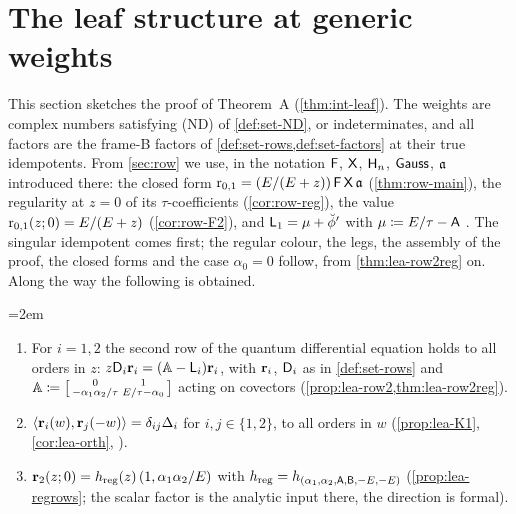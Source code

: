 \section{The leaf structure at generic weights}
\label{sec:lea}

This section sketches the proof of Theorem~A (\cref{thm:int-leaf}). The weights are complex numbers satisfying (ND) of \cref{def:set-ND}, or indeterminates, and all factors are the frame-B factors of \cref{def:set-rows,def:set-factors} at their true idempotents. From \cref{sec:row} we use, in the notation $\mathsf{F}$, $\mathsf{X}$, $\mathsf{H}_n$, $\mathsf{Gauss}$, $\mathfrak{a}$ introduced there: the closed form $\mathrm{r}_{0,1}=(E/(E+z))\,\mathsf{F}\,\mathsf{X}\,\mathfrak{a}$ (\cref{thm:row-main}), the regularity at $z=0$ of its $\tau$-coefficients (\cref{cor:row-reg}), the value $\mathrm{r}_{0,1}(z;0)=E/(E+z)$ (\cref{cor:row-F2}), and $\mathsf{L}_1=\mu+\breve{\phi}'$ with $\mu\coloneqq E/\tau-\mathsf{A}$ . The singular idempotent comes first; the regular colour, the legs, the assembly of the proof, the closed forms and the case $\alpha_0=0$ follow, from \cref{thm:lea-row2reg} on. Along the way the following is obtained.

\begin{thm}
\label{thm:lea-qde}
\emergencystretch=2em
\begin{enumerate}
\item For $i=1,2$ the second row of the quantum differential equation holds to all orders in $z$: $z\mathsf{D}_i\mathbf{r}_i=(\mathbb{A}-\mathsf{L}_i)\mathbf{r}_i$, with $\mathbf{r}_i$, $\mathsf{D}_i$ as in \cref{def:set-rows} and $\mathbb{A}\coloneqq\begin{bsmallmatrix}0&1\\-\alpha_1\alpha_2/\tau&E/\tau-\alpha_0\end{bsmallmatrix}$ acting on covectors (\cref{prop:lea-row2,thm:lea-row2reg}).
\item $\langle\mathbf{r}_i(w),\mathbf{r}_j(-w)\rangle=\delta_{ij}\Delta_i$ for $i,j\in\{1,2\}$, to all orders in $w$ (\cref{prop:lea-K1}, \cref{cor:lea-orth}, ).
\item $\mathbf{r}_2(z;0)=h_{\mathrm{reg}}(z)\,(1,\alpha_1\alpha_2/E)$ with $h_{\mathrm{reg}}=h_{(\alpha_1,\alpha_2,\mathsf{A},\mathsf{B},-E,-E)}$ (\cref{prop:lea-regrows}; the scalar factor is the analytic input there, the direction is formal).
\end{enumerate}
\end{thm}

